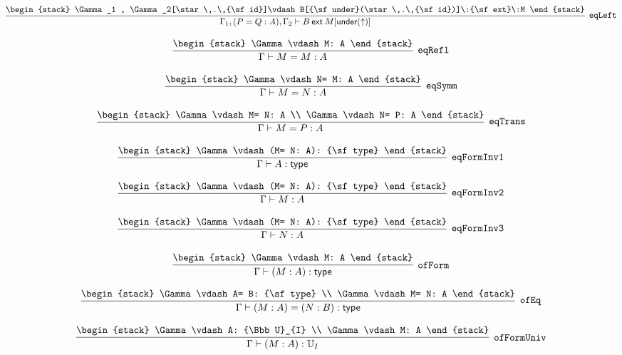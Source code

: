 \[
\infer[{\tt eqLeft}]{\Gamma_1 ,(P= Q: A), \Gamma_2 \vdash B\:{\sf ext}\:M[{\sf under}(\uparrow )]}{
\begin{stack}
\Gamma_1 , \Gamma_2[\star \,.\,{\sf id}]\vdash B[{\sf under}(\star \,.\,{\sf id})]\:{\sf ext}\:M
\end{stack}}
\]

\[
\infer[{\tt eqRefl}]{\Gamma \vdash M= M: A}{
\begin{stack}
\Gamma \vdash M: A
\end{stack}}
\]

\[
\infer[{\tt eqSymm}]{\Gamma \vdash M= N: A}{
\begin{stack}
\Gamma \vdash N= M: A
\end{stack}}
\]

\[
\infer[{\tt eqTrans}]{\Gamma \vdash M= P: A}{
\begin{stack}
\Gamma \vdash M= N: A
\\
\Gamma \vdash N= P: A
\end{stack}}
\]

\[
\infer[{\tt eqFormInv1}]{\Gamma \vdash A: {\sf type}}{
\begin{stack}
\Gamma \vdash (M= N: A): {\sf type}
\end{stack}}
\]

\[
\infer[{\tt eqFormInv2}]{\Gamma \vdash M: A}{
\begin{stack}
\Gamma \vdash (M= N: A): {\sf type}
\end{stack}}
\]

\[
\infer[{\tt eqFormInv3}]{\Gamma \vdash N: A}{
\begin{stack}
\Gamma \vdash (M= N: A): {\sf type}
\end{stack}}
\]

\[
\infer[{\tt ofForm}]{\Gamma \vdash (M: A): {\sf type}}{
\begin{stack}
\Gamma \vdash M: A
\end{stack}}
\]

\[
\infer[{\tt ofEq}]{\Gamma \vdash (M: A)= (N: B): {\sf type}}{
\begin{stack}
\Gamma \vdash A= B: {\sf type}
\\
\Gamma \vdash M= N: A
\end{stack}}
\]

\[
\infer[{\tt ofFormUniv}]{\Gamma \vdash (M: A): {\Bbb U}_{I}}{
\begin{stack}
\Gamma \vdash A: {\Bbb U}_{I}
\\
\Gamma \vdash M: A
\end{stack}}
\]

